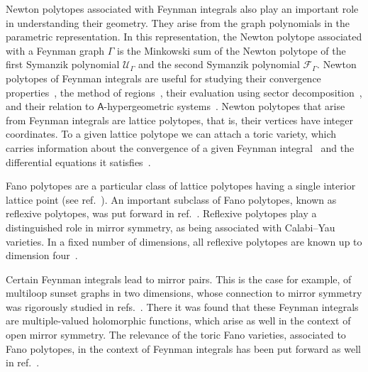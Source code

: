 \documentclass[12pt,a4paper]{article}
\theoremstyle{plain}
\theoremstyle{remark}
\newcommand{\sfA}{\mathsf{A}}
\newcommand{\cU}{\mathscr {U}}
\newcommand{\cF}{\mathscr {F}}
\begin{document}
Newton polytopes associated with Feynman integrals also play an important role in understanding their geometry. They arise from the graph polynomials in the parametric representation. In this representation, the Newton polytope associated with a  Feynman graph $\Gamma$ is the Minkowski sum of the Newton polytope of the first Symanzik polynomial $\cU_\Gamma$ and the second Symanzik polynomial $\cF_\Gamma$.
Newton polytopes of Feynman integrals are useful 
	for studying their convergence properties~\cite{2010arXiv1010.5060N,2011arXiv1103.6273B},  
	the method of regions~\cite{Ananthanarayan:2018tog,Gardi:2022khw,Gardi:2024axt,Ma:2023hrt},  their evaluation using sector decomposition~\cite{Borowka:2015mxa,Heinrich:2021dbf}, and their relation to $\sfA$-hypergeometric systems~\cite{GELFAND1990255, 2010arXiv1010.5060N, 2016arXiv160504970N, Schultka:2018nrs,  delaCruz:2019skx, Klausen:2019hrg, Klausen:2021yrt,Ananthanarayan:2022ntm}. 	 Newton polytopes that arise from Feynman integrals are lattice polytopes, that is, their vertices have integer coordinates.  To a given lattice polytope we can attach a toric variety, which carries information about the convergence of a given Feynman integral~\cite{2011arXiv1103.6273B} and the differential equations it satisfies~\cite{delaCruz:2019skx}.	
    
 Fano polytopes are a particular class of lattice polytopes having a single interior lattice point (see ref.~\cite{cox2011toric}).
 An important subclass of Fano polytopes, known as reflexive polytopes, was put forward
 in ref.~\cite{Batyrev:1993oya}.
 Reflexive polytopes play a distinguished role in mirror symmetry, as being associated with Calabi--Yau varieties.
In a fixed number of dimensions, all reflexive polytopes are known up to dimension four~\cite{Kreuzer:2000xy}. 

Certain Feynman integrals lead to mirror
pairs. This is the case for example, of  multiloop sunset graphs in two dimensions, whose connection to mirror symmetry was rigorously studied
in refs.~\cite{Bloch:2014qca,Bloch:2016izu}. There it was found that these Feynman integrals  are multiple-valued holomorphic
functions, which arise as well in the context of open mirror symmetry.
The relevance of the toric Fano varieties, associated to Fano polytopes, in the context of Feynman integrals has been put
forward as well in ref.~\cite{Schimmrigk:2024xid}.

\medskip
\end{document}
